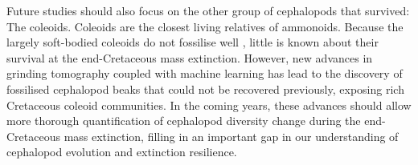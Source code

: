 \documentclass[a4paper]{article}
\begin{document}
Future studies should also focus on the other group of cephalopods that survived: The coleoids. Coleoids are the closest living relatives of ammonoids. Because the largely soft-bodied coleoids do not fossilise well \parencite{krogerCephalopodOriginEvolution2011}, little is known about their survival at the end-Cretaceous mass extinction. However, new advances in grinding tomography coupled with machine learning \parencite{ikegamiOriginRadiationSquids2025, ikegamiSquidsRadiatedGlobally2026} has lead to the discovery of fossilised cephalopod beaks that could not be recovered previously, exposing rich Cretaceous coleoid communities. 
In the coming years, these advances should allow more thorough quantification of cephalopod diversity change during the end-Cretaceous mass extinction, filling in an important gap in our understanding of cephalopod evolution and extinction resilience.  

\printbibliography
\end{document}
